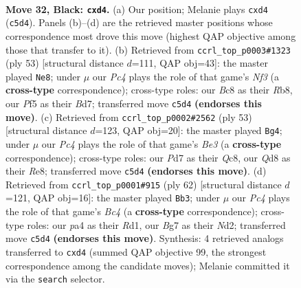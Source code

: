 \documentclass[11pt]{article}
\begin{document}
\clearpage

\begin{figure}[p]\centering
\begin{subfigure}{0.46\textwidth}\centering
\resizebox{\linewidth}{!}{%
\newchessgame
\chessboard[
  setfen={r1bq2k1/3pr1bp/p3p3/2p2p1B/P1nP1Q1P/5N2/1P3PK1/RNBR4 b - - 1 32},
  showmover=false,
  pgfstyle=straightmove, color=movearrow, markmove={c5-d4}
]}
\caption{}
\end{subfigure}\hfill
\begin{subfigure}{0.46\textwidth}\centering
\resizebox{\linewidth}{!}{%
\newchessgame
\chessboard[
  setfen={1rq3k1/1p1brpp1/2p2n1p/p7/4PP1P/PP1R2NP/1Q4BK/5R2 b - - 2 27},
  showmover=false,
  pgfstyle=straightmove, color=movearrow, markmove={f6-e8}
]}
\caption{}
\end{subfigure}
\\[4pt]
\begin{subfigure}{0.46\textwidth}\centering
\resizebox{\linewidth}{!}{%
\newchessgame
\chessboard[
  setfen={2q1r1k1/pp3rp1/2n1b2p/P1pN3Q/2P1pP2/2P1B3/3R2PP/R5K1 b - - 5 27},
  showmover=false,
  pgfstyle=straightmove, color=movearrow, markmove={e6-g4}
]}
\caption{}
\end{subfigure}\hfill
\begin{subfigure}{0.46\textwidth}\centering
\resizebox{\linewidth}{!}{%
\newchessgame
\chessboard[
  setfen={rn1rb3/1q3p1k/3p1npp/1p2p3/1PB1P2N/2P1R2P/3NQPP1/3R2K1 w - - 0 32},
  showmover=false,
  pgfstyle=straightmove, color=movearrow, markmove={c4-b3}
]}
\caption{}
\end{subfigure}
\caption{\textbf{Move 32, Black: \texttt{cxd4}.} (a) Our position; Melanie plays \texttt{cxd4} (\texttt{c5d4}). Panels (b)--(d) are the retrieved master positions whose correspondence most drove this move (highest QAP objective among those that transfer to it). (b) Retrieved from \texttt{ccrl\_top\_p0003\#1323} (ply 53) [structural distance $d$=111, QAP obj=43]: the master played \texttt{Ne8}; under $\mu$ our \emph{Pc4} plays the role of that game's \emph{Nf3} (a \textbf{cross-type} correspondence); cross-type roles: our \emph{B}c8 as their \emph{R}b8, our \emph{P}f5 as their \emph{B}d7; transferred move \texttt{c5d4} \textbf{(endorses this move)}. (c) Retrieved from \texttt{ccrl\_top\_p0002\#2562} (ply 53) [structural distance $d$=123, QAP obj=20]: the master played \texttt{Bg4}; under $\mu$ our \emph{Pc4} plays the role of that game's \emph{Be3} (a \textbf{cross-type} correspondence); cross-type roles: our \emph{P}d7 as their \emph{Q}c8, our \emph{Q}d8 as their \emph{R}e8; transferred move \texttt{c5d4} \textbf{(endorses this move)}. (d) Retrieved from \texttt{ccrl\_top\_p0001\#915} (ply 62) [structural distance $d$=121, QAP obj=16]: the master played \texttt{Bb3}; under $\mu$ our \emph{Pc4} plays the role of that game's \emph{Bc4} (a \textbf{cross-type} correspondence); cross-type roles: our \emph{p}a4 as their \emph{R}d1, our \emph{B}g7 as their \emph{N}d2; transferred move \texttt{c5d4} \textbf{(endorses this move)}. Synthesis: 4 retrieved analogs transferred to \texttt{cxd4} (summed QAP objective 99, the strongest correspondence among the candidate moves); Melanie committed it via the \texttt{search} selector.}
\label{fig:thought-m63}
\end{figure}
\end{document}
